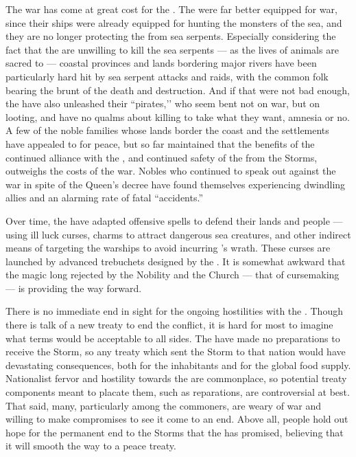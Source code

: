 \documentclass[blue]{GL2020}
\begin{document}
The war has come at great cost for the \pFarm{}. The \pShippies{} were far better equipped for war, since their ships were already equipped for hunting the monsters of the sea, and they are no longer protecting the \pFarm{} from sea serpents. Especially considering the fact that the \pFarmers{} are unwilling to kill the sea serpents — as the lives of animals are sacred to \cFarmGod{} — coastal provinces and lands bordering major rivers have been particularly hard hit by sea serpent attacks and \pShip{} raids, with the common folk bearing the brunt of the death and destruction. And if that were not bad enough, the \pShip{} have also unleashed their ``pirates,’’ who seem bent not on war, but on looting, and have no qualms about killing to take what they want, amnesia or no. A few of the noble families whose lands border the coast and the \pShip{} settlements have appealed to \cQueen{\Majesty} \cQueen{} for peace, but so far \cQueen{\they} \cQueen{\have} maintained that the benefits of the continued alliance with the \pTechies{}, and continued safety of the \pFarm{} from the Storms, outweighs the costs of the war. Nobles who continued to speak out against the war in spite of the Queen’s decree have found themselves experiencing dwindling allies and an alarming rate of fatal ``accidents.''

Over time, the \pFarm{} have adapted offensive spells to defend their lands and people — using ill luck curses, charms to attract dangerous sea creatures, and other indirect means of targeting the warships to avoid incurring \cFarmGod{}’s wrath. These curses are launched by advanced trebuchets designed by the \pTech{}. It is somewhat awkward that the magic long rejected by the Nobility and the Church — that of cursemaking — is providing the way forward.

There is no immediate end in sight for the ongoing hostilities with the \pShip{}.  Though there is talk of a new treaty to end the conflict, it is hard for most to imagine what terms would be acceptable to all sides. The \pFarm{} have made no preparations to receive the Storm, so any treaty which sent the Storm to that nation would have devastating consequences, both for the inhabitants and for the global food supply. Nationalist fervor and hostility towards the \pShippies{} are commonplace, so potential treaty components meant to placate them, such as reparations, are controversial at best. That said, many, particularly among the commoners, are weary of war and willing to make compromises to see it come to an end. Above all, people hold out hope for the permanent end to the Storms that the \pTech{} has promised, believing that it will smooth the way to a peace treaty.
\end{document}
